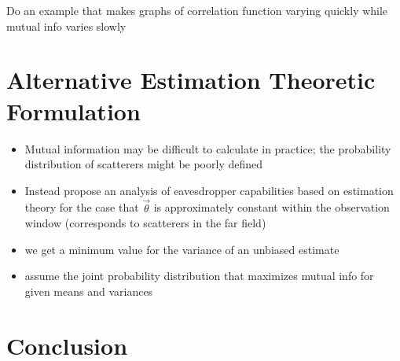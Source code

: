 \documentclass[journal]{ieeetran}
\begin{document}
Do an example that makes graphs of correlation function varying quickly while mutual info varies slowly

\section{Alternative Estimation Theoretic Formulation}
\begin{itemize}
\item Mutual information may be difficult to calculate in practice; the probability distribution of scatterers might be poorly defined
\item Instead propose an analysis of eavesdropper capabilities based on estimation theory for the case that $\vec{\theta}$ is approximately constant within the observation window (corresponds to scatterers in the far field) \cite{kckpVTC2015}
\item we get a minimum value for the variance of an unbiased estimate
\item assume the joint probability distribution that maximizes mutual info for given means and variances
\end{itemize}

\section{Conclusion}

{}
\end{document}
